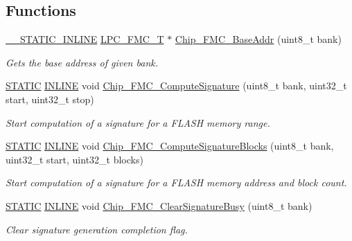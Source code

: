 \subsection*{Functions}
\begin{DoxyCompactItemize}
\item 
\hyperlink{cmsis__iccarm_8h_aba87361bfad2ae52cfe2f40c1a1dbf9c}{\+\_\+\+\_\+\+S\+T\+A\+T\+I\+C\+\_\+\+I\+N\+L\+I\+NE} \hyperlink{struct_l_p_c___f_m_c___t}{L\+P\+C\+\_\+\+F\+M\+C\+\_\+T} $\ast$ \hyperlink{group___f_m_c__18_x_x__43_x_x_ga0108061af4fc0814b1d3e2b5b1fc5579}{Chip\+\_\+\+F\+M\+C\+\_\+\+Base\+Addr} (uint8\+\_\+t bank)
\begin{DoxyCompactList}\small\item\em Gets the base address of given bank. \end{DoxyCompactList}\item 
\hyperlink{group___l_p_c___types___public___macros_ga10b2d890d871e1489bb02b7e70d9bdfb}{S\+T\+A\+T\+IC} \hyperlink{spifi__18xx__43xx_8h_a2eb6f9e0395b47b8d5e3eeae4fe0c116}{I\+N\+L\+I\+NE} void \hyperlink{group___f_m_c__18_x_x__43_x_x_ga743dd8b5f2e568d1bcf6d641b4587a3c}{Chip\+\_\+\+F\+M\+C\+\_\+\+Compute\+Signature} (uint8\+\_\+t bank, uint32\+\_\+t start, uint32\+\_\+t stop)
\begin{DoxyCompactList}\small\item\em Start computation of a signature for a F\+L\+A\+SH memory range. \end{DoxyCompactList}\item 
\hyperlink{group___l_p_c___types___public___macros_ga10b2d890d871e1489bb02b7e70d9bdfb}{S\+T\+A\+T\+IC} \hyperlink{spifi__18xx__43xx_8h_a2eb6f9e0395b47b8d5e3eeae4fe0c116}{I\+N\+L\+I\+NE} void \hyperlink{group___f_m_c__18_x_x__43_x_x_ga413d32194e2866d17bcc98d942fc4dd1}{Chip\+\_\+\+F\+M\+C\+\_\+\+Compute\+Signature\+Blocks} (uint8\+\_\+t bank, uint32\+\_\+t start, uint32\+\_\+t blocks)
\begin{DoxyCompactList}\small\item\em Start computation of a signature for a F\+L\+A\+SH memory address and block count. \end{DoxyCompactList}\item 
\hyperlink{group___l_p_c___types___public___macros_ga10b2d890d871e1489bb02b7e70d9bdfb}{S\+T\+A\+T\+IC} \hyperlink{spifi__18xx__43xx_8h_a2eb6f9e0395b47b8d5e3eeae4fe0c116}{I\+N\+L\+I\+NE} void \hyperlink{group___f_m_c__18_x_x__43_x_x_ga270a1f9bf6a1c70415a84ebd7c0065fe}{Chip\+\_\+\+F\+M\+C\+\_\+\+Clear\+Signature\+Busy} (uint8\+\_\+t bank)
\begin{DoxyCompactList}\small\item\em Clear signature generation completion flag. \end{DoxyCompactList}\item 

\end{DoxyCompactItemize}
